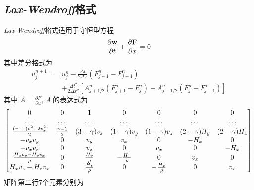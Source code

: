 \documentclass[10.5pt
]{article}
\begin{document}
\subsection{\textit{Lax-Wendroff}格式}
\textit{Lax-Wendroff}格式适用于守恒型方程
\begin{align}
\frac{\partial \vb w}{\partial t} + \frac{\partial \vb F}{\partial x} = 0
\end{align}
其中差分格式为
\begin{align}
u_j^{n+1} =& u_j^n - \frac{\Delta t}{2\Delta x} (F_{j+1}^n - F_{j-1}^n) \nonumber\\
& + \frac{\Delta t^2}{2\Delta x^2} \left[A_{j+1/2}^n (F_{j+1}^n-F_j^n) - A_{j-1/2}^n (F_j^n -
F_{j-1}^n)\right]
\end{align}
其中 $A = \frac{\partial F}{\partial u}$, $A$ 的表达式为
\begin{equation}
   \mqty[
0  &  0  &  1  &  0  &  0  &  0  &  0 \\
\dots  &  \dots  &  \dots  &  \dots  &  \dots  &  \dots  &  \dots \\
\frac{(\gamma-1) v^2-2v_x^2}{2 }  &  \frac{\gamma-1}{2}  &  (3-\gamma) v_x  & (1-\gamma) v_y  &  (1-\gamma) v_z  &  (2-\gamma) H_y  &  (2-\gamma) H_z \\
-v_x v_y  &  0  &  v_y  &  v_x  &  0  &  -H_x  &  0 \\
-v_x v_z  &  0  &  v_z  &  0  &  v_x  &  0  &  -H_x \\
\frac{H_x v_y-H_y v_x}{\rho}  &  0  &  \frac{H_y}{\rho}  &  -\frac{H_x}{\rho}  &  0  &  v_x  &  0 \\
H_x v_z-H_z v_x  &  0  &  \frac{H_z}{\rho}  &  0  &  -\frac{H_x}{\rho}  &  0  &  v_x ]
\end{equation}
矩阵第二行7个元素分别为
\end{document}
